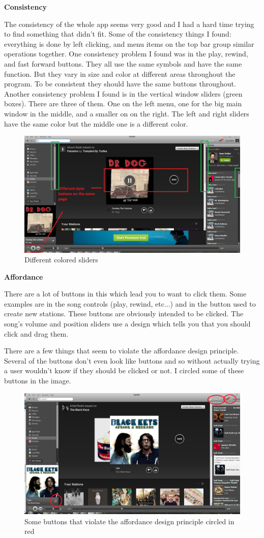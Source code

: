\documentclass[a4paper,12pt]{article}
\begin{document}
\textbf{Consistency}


The consistency of the whole app seems very good and I had a hard time trying to find something that didn't fit.  Some of the consistency things I found: everything is done by left clicking, and menu items on the top bar group similar operations together.    
One consistency problem I found was in the play, rewind, and fast forward buttons.  They all use the same symbols and have the same function. But they vary in size and color at different areas throughout the program.  To be consistent they should have the same buttons throughout.  Another consistency problem I found is in the vertical window sliders (green boxes).  There are three of them.  One on the left menu, one for the big main window in the middle, and a smaller on on the right.  The left and right sliders have the same color but the middle one is a different color.  

\begin{figure}[H]
\centering
\includegraphics[width=1\textwidth]{consistency}
\caption{Different colored sliders}
\end{figure}
\newpage
\textbf{Affordance}

There are a lot of buttons in this which lead you to want to click them.  Some examples are in the song controls (play, rewind, etc...) and in the button used to create new stations.  These buttons are obviously intended to be clicked.  The song's volume and position sliders use a design which tells you that you should click and drag them. 

There are a few things that seem to violate the affordance design principle.  Several of the buttons don't even look like buttons and so without actually trying a user wouldn't know if they should be clicked or not.  I circled some of these buttons in the image.  

\begin{figure}[H]
\centering
\includegraphics[width=1\textwidth]{affordance}
\caption{Some buttons that violate the affordance design principle circled in red}
\end{figure}
\end{document}
